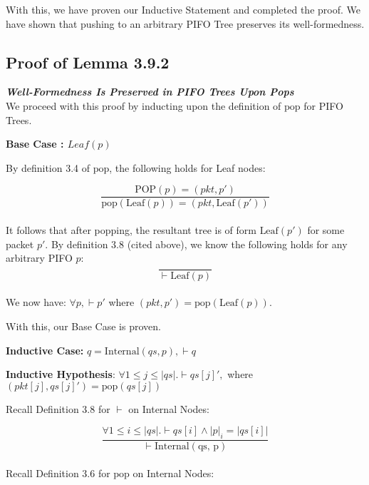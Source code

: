 \documentclass{article}
\begin{document}
With this, we have proven our Inductive Statement and completed the proof. We have shown that pushing to an arbitrary PIFO Tree preserves its well-formedness.\\[-10pt]

\subsection{Proof of Lemma 3.9.2}
\textit{\textbf{Well-Formedness Is Preserved in PIFO Trees Upon Pops}}\\[5pt]

We proceed with this proof by inducting upon the definition of $\text{pop}$ for PIFO Trees.\newline

\textbf{Base Case : $Leaf(p)$}\newline

By definition 3.4 of $\text{pop}$, the following holds for Leaf nodes:

$$\frac{\text{POP}(p) = (pkt, p')}{\text{pop}(\text{Leaf}(p)) = (pkt, \text{Leaf}(p'))}$$\\[-15pt]

It follows that after popping, the resultant tree is of form $\text{Leaf}(p')$ for some packet $p'$. By definition 3.8 (cited above), we know the following holds for any arbitrary PIFO $p$:\\[-20pt]

$$\frac{}{\vdash \text{Leaf}(p)}$$\\[-10pt]

We now have: $\forall p, \vdash p'$ where $(pkt, p') = \text{pop}(\text{Leaf}(p))$.\newline

With this, our Base Case is proven.\newline


\textbf{Inductive Case:} $q = \text{Internal}(qs, p), \vdash q$\newline

\textbf{Inductive Hypothesis}: $\forall 1 \leq j \leq |qs|. \vdash qs[j]',$ where $(pkt[j], qs[j]') = \text{pop}(qs[j])$\newline

Recall Definition 3.8 for $\vdash$ on Internal Nodes:

$$\frac{\forall 1 \leq i \leq |qs|. \vdash qs[i] \land |p|_i = |qs[i]|}{\vdash \text{Internal}(\text{qs, p})}$$\\[-10pt]

Recall Definition 3.6 for $\text{pop}$ on Internal Nodes:
\end{document}
